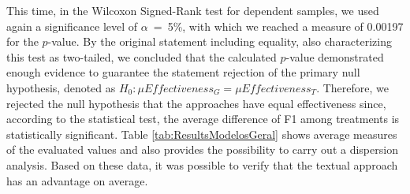This time, in the Wilcoxon Signed-Rank test for dependent samples, we used again a significance level of $\alpha$~=~5\%, with which we reached a measure of 0.00197 for the $p$-value.
By the original statement including equality, also characterizing this test as two-tailed, we concluded that the calculated $p$-value demonstrated enough evidence to guarantee the statement rejection of the primary null hypothesis, denoted as $H_0: \mu Effectiveness_G = \mu Effectiveness_T$.
Therefore, we rejected the null hypothesis that the approaches have equal effectiveness since, according to the statistical test, the average difference of F1 among treatments is statistically significant.
Table \ref{tab:ResultsModelosGeral} shows average measures of the evaluated values and also provides the possibility to carry out a dispersion analysis.
Based on these data, it was possible to verify that the textual approach has an advantage on average.

